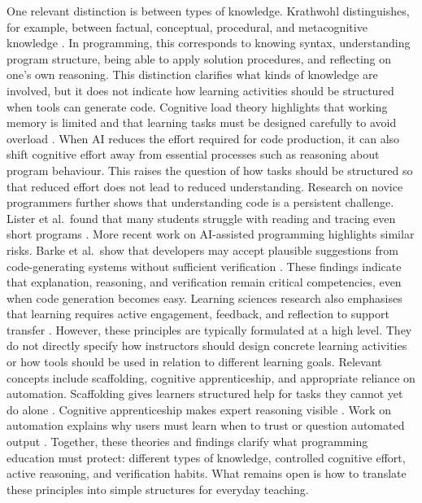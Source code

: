\documentclass{article}
\begin{document}
One relevant distinction is between types of knowledge. Krathwohl distinguishes, for example, between factual, conceptual, procedural, and metacognitive knowledge \citep{Krathwohl2002}. In programming, this corresponds to knowing syntax, understanding program structure, being able to apply solution procedures, and reflecting on one's own reasoning. This distinction clarifies what kinds of knowledge are involved, but it does not indicate how learning activities should be structured when tools can generate code.
%
Cognitive load theory highlights that working memory is limited and that learning tasks must be designed carefully to avoid overload \citep{SwellerAyresKalyuga2011CognitiveLoadTheory}. When AI reduces the effort required for code production, it can also shift cognitive effort away from essential processes such as reasoning about program behaviour. This raises the question of how tasks should be structured so that reduced effort does not lead to reduced understanding.
%
Research on novice programmers further shows that understanding code is a persistent challenge. Lister et al.\ found that many students struggle with reading and tracing even short programs \citep{ListerEtAl2004Tracing}. More recent work on AI-assisted programming highlights similar risks. Barke et al.\ show that developers may accept plausible suggestions from code-generating systems without sufficient verification \citep{BarkeEtAl2023GroundedCopilot}. These findings indicate that explanation, reasoning, and verification remain critical competencies, even when code generation becomes easy.
%
Learning sciences research also emphasises that learning requires active engagement, feedback, and reflection to support transfer \citep{NRC1999HowPeopleLearn}. However, these principles are typically formulated at a high level. They do not directly specify how instructors should design concrete learning activities or how tools should be used in relation to different learning goals.
%
Relevant concepts include scaffolding, cognitive apprenticeship, and appropriate reliance on automation. Scaffolding gives learners structured help for tasks they cannot yet do alone \citep{WoodBrunerRoss1976Scaffolding}. Cognitive apprenticeship makes expert reasoning visible \citep{CollinsBrownNewman1989CognitiveApprenticeship}. Work on automation explains why users must learn when to trust or question automated output \citep{LeeSee2004Trust}. Together, these theories and findings clarify what programming education must protect: different types of knowledge, controlled cognitive effort, active reasoning, and verification habits. What remains open is how to translate these principles into simple structures for everyday teaching.
\end{document}
